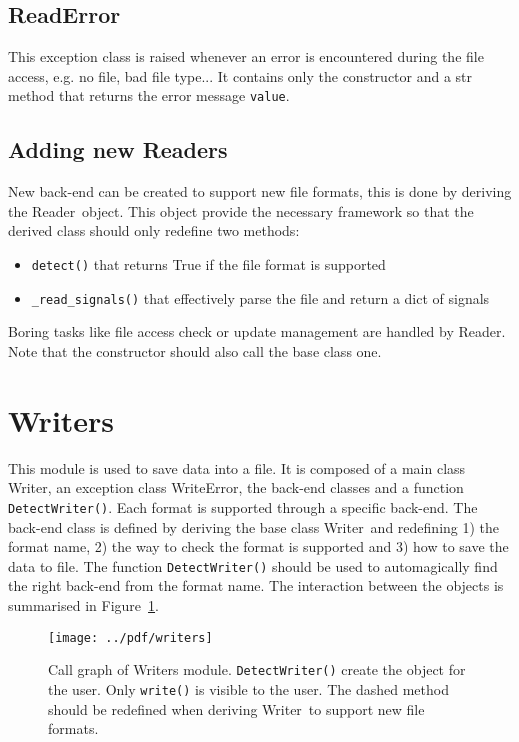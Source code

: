 \documentclass[a4paper,11pt]{article}
\newcommand{\att}[1]{\texttt{#1}}
\newcommand{\meth}[1]{\texttt{#1()}}
\newcommand{\cls}[1]{\textsf{#1}}
\newcommand{\rd}{\cls{Reader}}
\newcommand{\wrt}{\cls{Writer}}
\newcommand{\wrterr}{\cls{WriteError}}
\begin{document}
\subsection{ReadError}
\label{sec:readers:readerror}
This exception class is raised whenever an error is encountered during the file access, e.g. no file, bad file type...
It contains only the constructor and a str method that returns the error message \att{value}.

\subsection{Adding new Readers}
\label{sec:readers:add}
New back-end can be created to support new file formats, this is done by deriving the \rd\ object.
This object provide the necessary framework so that the derived class should only redefine two methods:
\begin{itemize}
\item \meth{detect} that returns True if the file format is supported
\item \meth{\_read\_signals} that effectively parse the file and return a dict of signals
\end{itemize}
Boring tasks like file access check or update management are handled by \rd.
Note that the constructor should also call the base class one.

\section{Writers}
\label{sec:writers}
This module is used to save data into a file.
It is composed of a main class \wrt, an exception class \wrterr, the back-end classes and a function \meth{DetectWriter}.
Each format is supported through a specific back-end.
The back-end class is defined by deriving the base class \wrt\ and redefining 1) the format name, 2) the way to check the format is supported and 3) how to save the data to file.
The function \meth{DetectWriter} should be used to automagically find the right back-end from the format name.
The interaction between the objects is summarised in Figure~\ref{fig:wrts:callgraph}.

\begin{figure}[htbp]
  \centering
  \texttt{[image: ../pdf/writers]}
  \caption{Call graph of Writers module. \meth{DetectWriter} create the object for the user. Only \meth{write} is visible to the user. The dashed method should be redefined when deriving \wrt\ to support new file formats.}
  \label{fig:wrts:callgraph}
\end{figure}
\end{document}
